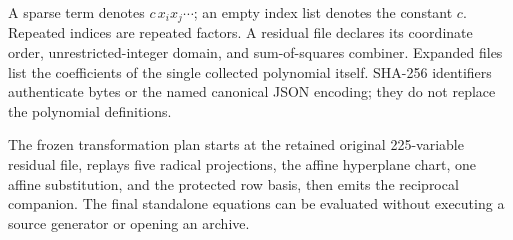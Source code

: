 \documentclass[11pt,letterpaper]{article}
\theoremstyle{definition}\newtheorem{definition}[theorem]{Definition}
\theoremstyle{remark}\newtheorem{remark}[theorem]{Remark}
\newcommand{\code}[1]{\texttt{\detokenize{#1}}}
\begin{document}
A sparse term \code{[c,[i,j,...]]} denotes
$c\,x_i x_j\cdots$; an empty index list denotes the constant $c$.
Repeated indices are repeated factors. A residual file declares its
coordinate order, unrestricted-integer domain, and sum-of-squares
combiner. Expanded files list the coefficients of the single collected
polynomial itself. SHA-256 identifiers authenticate bytes or the named
canonical JSON encoding; they do not replace the polynomial definitions.



The frozen transformation plan starts at the retained original
225-variable residual file, replays five radical projections, the affine
hyperplane chart, one affine substitution, and the protected row basis,
then emits the reciprocal companion. The final standalone equations can
be evaluated without executing a source generator or opening an archive.
\end{document}
